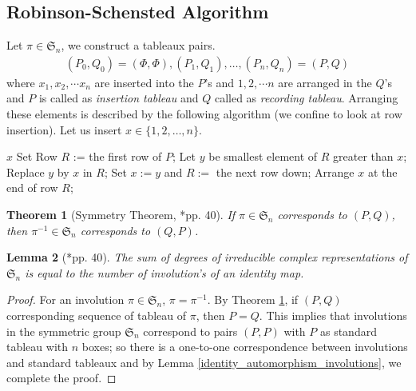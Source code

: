 \documentclass[oneside]{amsart}
\theoremstyle{plain}
\newtheorem{theorem}{Theorem}[section] %
\newtheorem{lemma}[theorem]{Lemma} %
\theoremstyle{definition}
\theoremstyle{remark}
\begin{document}
\subsection{Robinson-Schensted Algorithm}
    Let $\pi \in \mathfrak{S}_n$, we construct a tableaux pairs.
    \begin{align*}
        (P_0, Q_0) = (\Phi, \Phi), (P_1, Q_1), \ldots , (P_n, Q_n) = (P, Q)
    \end{align*}
    where $x_1, x_2, \cdots x_n$ are inserted into the $P$'s and $1, 2, \cdots n$ are arranged in the $Q$'s and $P$ is called as \textit{insertion tableau} and $Q$ called as \textit{recording tableau}. Arranging these elements is described by the following algorithm (we confine to look at row insertion). Let us insert $x \in \{1, 2, \ldots , n\}$.
    
    \begin{algorithm}
    \caption{Robinson-Schensted Algorithm} \label{alg:cap}
    \begin{algorithmic}[1]
        \Require $x$
        \State Set Row $R$ := the first row of $P$;
        \State Let $y$ be smallest element of $R$ greater than $x$;
        \State Replace $y$ by $x$ in $R$;
        \State Set $x:=y$ and $R:=$ the next row down;
        \EndWhile
        \State Arrange $x$ at the end of row $R$;
    \end{algorithmic}
    \end{algorithm}
    
    \begin{theorem}[Symmetry Theorem, \cite{MR1464693}*{pp. 40}] \label{symmetry_theorem}
        If $\pi \in \mathfrak{S}_n$ corresponds to $(P, Q)$, then $\pi^{-1} \in \mathfrak{S}_n$ corresponds to $(Q, P)$.
    \end{theorem}
    
    \begin{lemma}[\cite{MR1464693}*{pp. 40}]\label{frobenius_Schur}
        The sum of degrees of irreducible complex representations of $\mathfrak{S}_n$ is equal to the number of involution's of an identity map.
    \end{lemma}
    \begin{proof}
        For an involution $\pi \in \mathfrak{S}_n$, $\pi = \pi^{-1}$. By Theorem \ref{symmetry_theorem}, if $(P, Q)$ corresponding sequence of tableau of $\pi$, then $P = Q$. This implies that involutions in the symmetric group $\mathfrak{S}_n$ correspond to pairs $(P,P)$ with $P$ as standard tableau with $n$ boxes; so there is a one-to-one correspondence between involutions and standard tableaux and by Lemma \ref{identity_automorphism_involutions}, we complete the proof.
    \end{proof}
    
\end{document}
